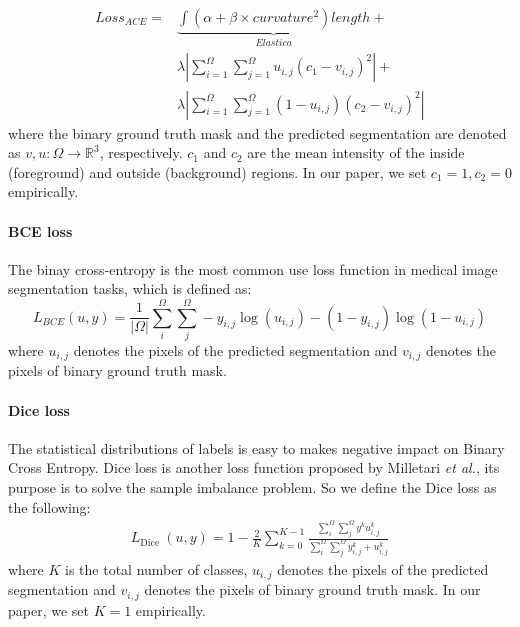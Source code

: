 \documentclass{ieeeaccess}
\begin{document}
  \begin{align}
    Loss_{ACE}=&\underset{Elastica}{\underbrace{\int{\left( \alpha +\beta \times curvature^2 \right)}length}}+\\
    &\lambda \left| \sum_{i=1}^{\Omega}{\sum_{j=1}^{\Omega}{u_{i,j}}\left( c_1-v_{i,j} \right) ^2} \right|+\\
    &\lambda \left| \sum_{i=1}^{\Omega}{\sum_{j=1}^{\Omega}{\left( 1-u_{i,j} \right)}\left( c_2-v_{i,j} \right) ^2} \right|  
  \end{align}
  where the binary ground truth mask and the predicted segmentation are denoted as \(v, u: \Omega \rightarrow \mathbb{R}^{3}\), respectively. 
  $c_1$ and $c_2$ are the mean intensity of the inside (foreground) and outside (background) regions. In our paper, we set $c_{1}=1, c_{2}=0$ empirically.
  \paragraph{BCE loss}
  The binay cross-entropy is the most common use loss function in medical image segmentation tasks, which is defined as:
  \begin{equation}
    L_{BCE}(u, y)=\frac{1}{|\Omega|} \sum_{i}^{\Omega}\sum_{j}^{\Omega}-y_{i,j} \log \left(u_{i,j}\right)-\left(1-y_{i,j}\right) \log \left(1-u_{i,j}\right)
  \end{equation}
  where \(u_{i,j}\) denotes the pixels of the predicted segmentation and \(v_{i,j}\) denotes the pixels of binary ground truth mask.
  
  \paragraph{Dice loss}
  The statistical distributions of labels is easy to makes negative impact on Binary Cross Entropy. 
  Dice loss is another loss function proposed by Milletari\cite{vnet} \emph{et al.}, its purpose is to solve the sample imbalance problem. So we define the Dice loss as the following:
  \begin{align}
    L_{\text {Dice }}(u, y)=1-\frac{2}{K} \sum_{k=0}^{K-1} \frac{\sum_{i}^{\Omega}\sum_{j}^{\Omega} y^{k} u_{i,j}^{k}}{\sum_{i}^{\Omega}\sum_{j}^{\Omega} y_{i,j}^{k}+u_{i,j}^{k}}
  \end{align}
  where \(K\) is the total number of classes, \(u_{i,j}\) denotes the pixels of the predicted segmentation and \(v_{i,j}\) denotes the pixels of binary ground truth mask. In our paper, we set \(K=1\) empirically.
  
\end{document}
